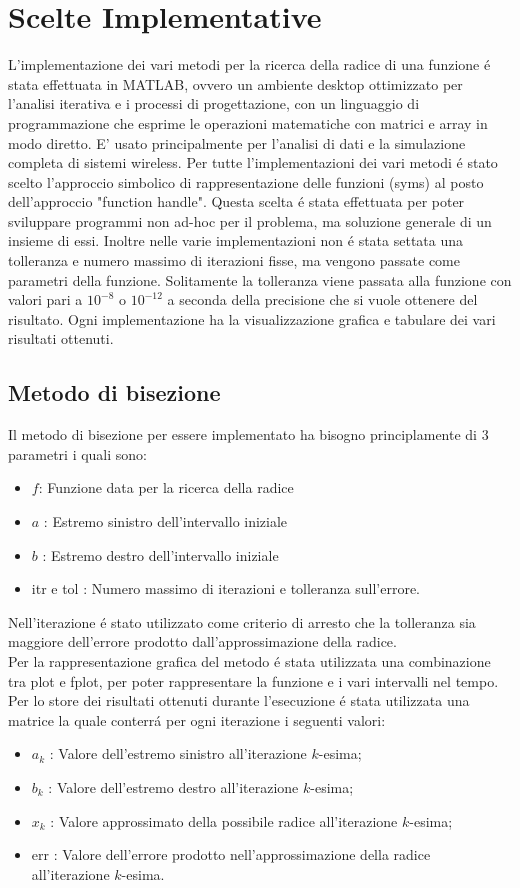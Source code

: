 \documentclass[12pt, letterpaper]{article}
\begin{document}
\section{Scelte Implementative}
L'implementazione dei vari metodi per la ricerca della radice di una funzione \'e stata effettuata in MATLAB, ovvero un ambiente desktop ottimizzato per l'analisi iterativa e i processi di progettazione, con un linguaggio di programmazione che esprime le operazioni matematiche con matrici e array in modo diretto.
E' usato principalmente per l'analisi di dati e la simulazione completa di sistemi wireless.
Per tutte l'implementazioni dei vari metodi \'e stato scelto l'approccio simbolico di rappresentazione delle funzioni (syms) al posto dell'approccio "function handle". 
Questa scelta \'e stata effettuata per poter sviluppare programmi non ad-hoc per il problema, ma soluzione generale di un insieme di essi. 
Inoltre nelle varie implementazioni non \'e stata settata una tolleranza e numero massimo di iterazioni fisse, ma vengono passate come parametri della funzione. Solitamente la tolleranza viene passata alla funzione con valori pari a $10^{-8}$ o $10^{-12}$ a seconda della precisione che si vuole ottenere del risultato.
Ogni implementazione ha la visualizzazione grafica e tabulare dei vari risultati ottenuti.
\subsection{Metodo di bisezione}
Il metodo di bisezione per essere implementato ha bisogno principlamente di $3$ parametri i quali sono:
\begin{itemize}
    \item $f$: Funzione data per la ricerca della radice
    \item $a$ : Estremo sinistro dell'intervallo iniziale
    \item $b$ : Estremo destro dell'intervallo iniziale
    \item itr e tol : Numero massimo di iterazioni e tolleranza sull'errore.
\end{itemize}
Nell'iterazione \'e stato utilizzato come criterio di arresto che la tolleranza sia maggiore dell'errore prodotto dall'approssimazione della radice.  \\
Per la rappresentazione grafica del metodo \'e stata utilizzata una combinazione tra plot e fplot, per poter rappresentare la funzione e i vari intervalli nel tempo. \\
Per lo store dei risultati ottenuti durante l'esecuzione \'e stata utilizzata una matrice la quale conterr\'a per ogni iterazione i seguenti valori:
\begin{itemize}
    \item $a_k$ : Valore dell'estremo sinistro all'iterazione $k$-esima;
    \item $b_k$ : Valore dell'estremo destro all'iterazione $k$-esima;
    \item $x_k$ : Valore approssimato della possibile radice all'iterazione $k$-esima;
    \item err   : Valore dell'errore prodotto nell'approssimazione della radice all'iterazione $k$-esima.
\end{itemize} 
\end{document}
